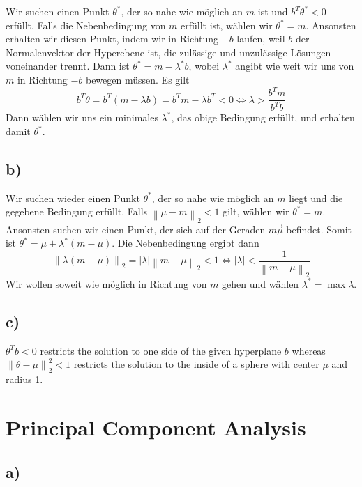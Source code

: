 \documentclass[paper=a4,fontsize=10pt,DIV11,BCOR10mm]{scrartcl}
\newcommand{\abs}[1]{\left\lvert#1\right\rvert}
\newcommand{\norm}[1]{\left\lVert#1\right\rVert}
\begin{document}
Wir suchen einen Punkt $\theta^*$, der so nahe wie möglich an $m$ ist und $b^T \theta^* < 0$ erfüllt. Falls die Nebenbedingung von $m$ erfüllt ist, wählen wir $\theta^* = m$. Ansonsten erhalten wir diesen Punkt, indem wir in Richtung $-b$ laufen, weil $b$ der Normalenvektor der Hyperebene ist, die zulässige und unzulässige Lösungen voneinander trennt. Dann ist $\theta^* = m - \lambda^* b$, wobei $\lambda^*$ angibt wie weit wir uns von $m$ in Richtung $-b$ bewegen müssen. Es gilt
\[ b^T \theta = b^T (m - \lambda b) = b^T m - \lambda b^T < 0 \Leftrightarrow \lambda > \frac{b^T m}{b^T b} \]
Dann wählen wir uns ein minimales $\lambda^*$, das obige Bedingung erfüllt, und erhalten damit $\theta^*$.



\subsection*{b)}

Wir suchen wieder einen Punkt $\theta^*$, der so nahe wie möglich an $m$ liegt und die gegebene Bedingung erfüllt. Falls $\norm{\mu - m}_2 < 1$ gilt, wählen wir $\theta^* = m$. Ansonsten suchen wir einen Punkt, der sich auf der Geraden $\overrightarrow{m \mu}$ befindet. Somit ist $\theta^* = \mu + \lambda^* (m - \mu)$. Die Nebenbedingung ergibt dann
\[ \norm{\lambda (m - \mu)}_2 = \abs{\lambda} \norm{m - \mu}_2 < 1 \Leftrightarrow \abs{\lambda} < \frac{1}{\norm{m - \mu}_2} \]
Wir wollen soweit wie möglich in Richtung von $m$ gehen und wählen $\lambda^* = \max \lambda$.



\subsection*{c)}

$\theta^T b < 0$ restricts the solution to one side of the given hyperplane $b$ whereas $\norm{\theta - \mu}_2^2 < 1$ restricts the solution to the inside of a sphere with center $\mu$ and radius 1.





\section{Principal Component Analysis}

\subsection*{a)}
\end{document}
